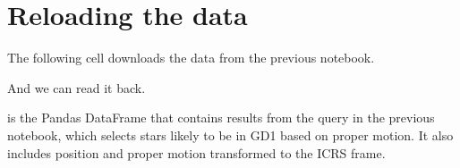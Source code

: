 \documentclass[letterpaper,10pt,english]{sphinxmanual}
\begin{document}
\section{Reloading the data}
\label{\detokenize{05_join:reloading-the-data}}
The following cell downloads the data from the previous notebook.

\begin{sphinxVerbatim}[commandchars=\\\{\}]
 
   

  
  

  
\end{sphinxVerbatim}

And we can read it back.

\begin{sphinxVerbatim}[commandchars=\\\{\}]
   

   
\end{sphinxVerbatim}

 is the Pandas DataFrame that contains results from the query in the previous notebook, which selects stars likely to be in GD\sphinxhyphen{}1 based on proper motion.  It also includes position and proper motion transformed to the ICRS frame.
\end{document}
